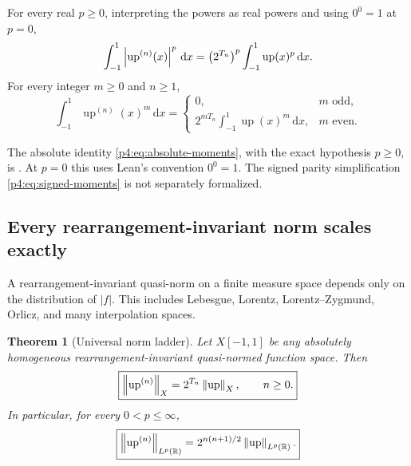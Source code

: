 \documentclass[11pt,oneside]{article}
\newtheorem{theorem}{Theorem}[section]
\theoremstyle{definition}
\theoremstyle{remark}
\newcommand{\R}{\mathbb R}
\newcommand{\Up}{\operatorname{up}}
\newcommand{\dd}{\,\mathrm d}
\begin{document}
\begin{corollary}
\label{p4:cor:all-value-moments}
For every real $p\geq0$, interpreting the powers as real powers and using \(0^0=1\) at
\(p=0\),
\begin{equation}
 \int_{-1}^{1}\abs{\Up^{(n)}(x)}^p\dd x
 =\left(2^{T_n}\right)^p\int_{-1}^{1}\Up(x)^p\dd x.
 \label{p4:eq:absolute-moments}
\end{equation}
For every integer $m\geq0$ and $n\geq1$,
\begin{equation}
 \int_{-1}^{1}\Up^{(n)}(x)^m\dd x
 =\begin{cases}
  0,&m\text{ odd},\\
  2^{mT_n}\displaystyle\int_{-1}^{1}\Up(x)^m\dd x,&m\text{ even}.
 \end{cases}
 \label{p4:eq:signed-moments}
\end{equation}
\end{corollary}

The absolute identity \eqref{p4:eq:absolute-moments}, with the exact hypothesis \(p\ge0\), is
.  At \(p=0\) this uses Lean's
 convention \(0^0=1\).  The signed parity simplification
\eqref{p4:eq:signed-moments} is not separately formalized.

\subsection{Every rearrangement-invariant norm scales exactly}

A rearrangement-invariant quasi-norm on a finite measure space depends only on the
distribution of $|f|$.  This includes Lebesgue, Lorentz, Lorentz--Zygmund, Orlicz, and many
interpolation spaces.

\begin{theorem}[Universal norm ladder]
\label{p4:thm:universal-norm-ladder}
Let $X[-1,1]$ be any absolutely homogeneous rearrangement-invariant quasi-normed function
space.  Then
\begin{equation}
 \boxed{
 \norm{\Up^{(n)}}_X=2^{T_n}\norm{\Up}_X,
 \qquad n\geq0.}
 \label{p4:eq:RI-norm-law}
\end{equation}
In particular, for every $0<p\leq\infty$,
\begin{equation}
 \boxed{
 \norm{\Up^{(n)}}_{L^p(\R)}
 =2^{n(n+1)/2}\norm{\Up}_{L^p(\R)}.}
 \label{p4:eq:Lp-norm-law}
\end{equation}
\end{theorem}
\end{document}
